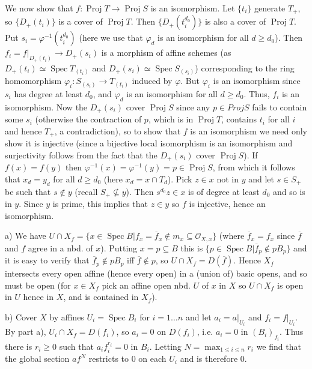 \documentclass{report}
\renewcommand{\O}{\mathcal{O}}
\DeclareMathOperator{\Spec}{Spec}
\DeclareMathOperator{\Proj}{Proj}
\begin{document}
We now show that $f:\Proj T\rightarrow \Proj S$ is an isomorphism.
Let $\{t_i\}$ generate $T_+$, so $\{D_+(t_i)\}$ is a cover of $\Proj T$.  Then $\{D_+(t_i^{d_0})\}$ is
also a cover of $\Proj T$.  Put $s_i=\varphi^{-1}(t_i^{d_0})$
 (here we use that $\varphi_d$ is an isomorphism for all $d\ge d_0$).
 Then $f_i=f\big|_{D_+(t_i)}\rightarrow D_+(s_i)$ is a morphism of affine schemes (as
 $D_+(t_i)\simeq \Spec T_{(t_i)}$ and $D_+(s_i)\simeq \Spec S_{(s_i)}$) corresponding
 to the ring homomorphism $\varphi_i: S_{(s_i)}\rightarrow T_{(t_i)}$  induced by
 $\varphi$.	But $\varphi_i$ is an isomorphism since $s_i$ has degree at least $d_0$,
 and $\varphi_d$ is an isomorphism for all $d\ge d_0$.	Thus, $f_i$ is an isomorphism.
 Now the $D_+(s_i)$ cover $\Proj S$ since any $p\in Proj S$ fails to contain some $s_i$
 (otherwise the contraction of $p$, which is in $\Proj T$, contains $t_i$ for all $i$ and
 hence $T_+$, a contradiction), so to show that $f$ is an isomorphism
 we need only show it is injective (since a bijective local isomorphism is an isomorphism and
 surjectivity follows from the fact that the $D_+(s_i)$ cover $\Proj S$).
If $f(x)=f(y)$ then $\varphi^{-1}(x)=\varphi^{-1}(y)=p\in\Proj S$, from which it follows that
$x_d=y_d$ for all $d\ge d_0$ (here $x_d=x\cap T_d$).	Pick $z\in x$ not in $y$ and let
$s\in S_+$ be such that $s\not\in y$ (recall $S_+\not\subseteq y$).  Then $s^{d_0}z\in x$
is of degree at least $d_0$ and so is in $y$.  Since $y$ is prime, this implies that $z\in y$
so $f$ is injective, hence an isomorphism. 
 

\bigskip
{}	a)	We have $U\cap X_f=\{x\in\Spec B\big| f_x=\overline{f}_x\not\in m_x\subseteq \O_{X,x}\}$
(where $\overline{f}_x=f_x$ since $\overline{f}$ and $f$ agree in a nbd. of $x$).
Putting $x=p\subseteq B$ this is $\{p\in\Spec B\big| \overline{f}_p\not\in pB_p\}$
and it is easy to verify that $\overline{f}_p\not\in pB_p$ iff $\overline{f}\not\in p$,
so $U\cap X_f=D(\overline{f})$.  Hence $X_f$ intersects every open affine (hence every open) in
a (union of) basic opens, and so must be open  (for $x\in X_f$ pick an affine open nbd. $U$ of $x$ in $X$ so
$U\cap X_f$ is open in $U$ hence in $X$, and is contained in $X_f$).

\noindent
b)	Cover $X$ by affines $U_i=\Spec B_i$ for $i=1\ldots n$ and let $a_i=a\big|_{U_i}$ and $f_i=f\big|_{U_i}$.
By part a), $U_i\cap X_f=D(f_i)$, so $a_i=0$ on $D(f_i)$, i.e. $a_i=0$ in $(B_i)_{f_i}$.  Thus there
is $r_i\ge 0$ such that $a_i f_i^{r_i}=0$ in $B_i$.  Letting $N=\max_{1\le i\le n} r_i$ we find that
the global section $af^N$ restricts to 0 on each $U_i$ and is therefore 0.
\end{document}
